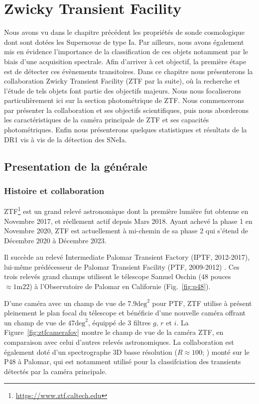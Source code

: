 \documentclass[../main/main.tex]{subfiles}
\begin{document}
\dominitoc
\faketableofcontents
\setcounter{chapter}{1}
\chapter{Zwicky Transient Facility}\label{ch:ztf}

\minitoc
\vspace{2cm}
Nous avons vu dans le chapitre précédent les propriétés
de sonde
cosmologique dont sont dotées les Supernovae de type Ia. Par
ailleurs, nous avons également mis en évidence l'importance de la
classification de ces objets notamment par le biais d'une acquisition
spectrale. Afin d'arriver à cet objectif, la première étape est de
détecter ces évènements transitoires. Dans ce chapitre nous présenterons
la collaboration Zwicky Transient Facility (ZTF par la suite), où la recherche et
l'étude de tels objets font partie des objectifs majeurs. Nous nous
focaliserons particulièrement ici sur la section photométrique de
ZTF. Nous commencerons par présenter la collaboration et ses objectifs
scientifiques, puis nous aborderons les caractéristiques de la caméra principale de ZTF et ses capacités
photométriques. Enfin nous présenterons quelques statistiques et résultats
de la DR1 vis à vis de la détection des SNeIa.
\newpage
\section{Presentation de la générale}
\label{sec:ztfcollab}


\subsection{Histoire et collaboration}

ZTF\footnote{\url{https://www.ztf.caltech.edu}} \citep{GrahamZTF2019,BellmZTF2019}  est un grand relevé astronomique dont la première lumière fut
obtenue en Novembre 2017, et réellement actif depuis Mars
2018. Ayant achevé la phase 1 en Novembre 2020, ZTF est actuellement à
mi-chemin de sa phase 2 qui s'étend de Décembre 2020 à Décembre 2023.

Il succède au relevé Intermediate Palomar Transient Factory (IPTF, 2012-2017),
lui-même prédécesseur de Palomar Transient Facility (PTF, 2009-2012)
\citep{RauPTF2009,LawPTF2009}. Ces trois relevés grand
champs utilisent le télescope Samuel
Oschin ($48$ pouces $\approx 1\text{m}22$) à l'Observatoire de Palomar en
Californie (Fig.~\ref{fig:p48}).

D'une caméra avec un champ de vue de $7.9 \text{deg}^{2}$
pour PTF, ZTF utilise à présent pleinement le plan focal du télescope et
bénéficie d'une nouvelle caméra offrant un champ de vue de $47
\text{deg}^{2}$, équippé de 3 filtres $g$, $r$ et $i$. La
Figure~\ref{fig:ztfcamerafov} montre le champ de vue de la caméra ZTF,
en comparaison avec celui d'autres relevés astronomiques. La collaboration est également doté d'un spectrographe
3D basse résolution ($R\approx100$; \citet{SEDM18}) monté sur le P48 à
Palomar, qui est notamment
utilisé pour la classifciation des transients détectés par la caméra principale.
\end{document}

